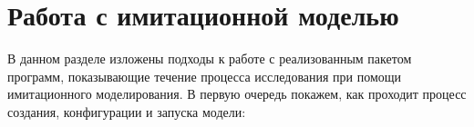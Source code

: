 \section{Работа с имитационной моделью}
В данном разделе изложены подходы к работе с реализованным пакетом программ, показывающие течение процесса исследования при помощи имитационного моделирования. В первую очередь покажем, как проходит процесс создания, конфигурации и запуска модели:
